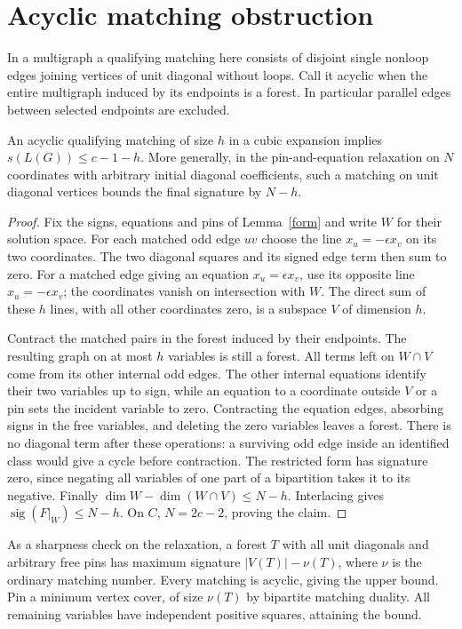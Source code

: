 \documentclass[11pt]{article}
\newcommand{\sig}{\operatorname{sig}}
\begin{document}
\section{Acyclic matching obstruction}
In a multigraph a qualifying matching here consists of disjoint single nonloop edges joining vertices of unit diagonal without loops. Call it acyclic when the entire multigraph induced by its endpoints is a forest. In particular parallel edges between selected endpoints are excluded.
\begin{lemma}\label{forest}
An acyclic qualifying matching of size $h$ in a cubic expansion implies $s(L(G))\le c-1-h$. More generally, in the pin-and-equation relaxation on $N$ coordinates with arbitrary initial diagonal coefficients, such a matching on unit diagonal vertices bounds the final signature by $N-h$.
\end{lemma}
\begin{proof}
Fix the signs, equations and pins of Lemma~\ref{form} and write $W$ for their solution space. For each matched odd edge $uv$ choose the line $x_u=-\epsilon x_v$ on its two coordinates. The two diagonal squares and its signed edge term then sum to zero. For a matched edge giving an equation $x_u=\epsilon x_v$, use its opposite line $x_u=-\epsilon x_v$; the coordinates vanish on intersection with $W$. The direct sum of these $h$ lines, with all other coordinates zero, is a subspace $V$ of dimension $h$.

Contract the matched pairs in the forest induced by their endpoints. The resulting graph on at most $h$ variables is still a forest. All terms left on $W\cap V$ come from its other internal odd edges. The other internal equations identify their two variables up to sign, while an equation to a coordinate outside $V$ or a pin sets the incident variable to zero. Contracting the equation edges, absorbing signs in the free variables, and deleting the zero variables leaves a forest. There is no diagonal term after these operations: a surviving odd edge inside an identified class would give a cycle before contraction. The restricted form has signature zero, since negating all variables of one part of a bipartition takes it to its negative. Finally $\dim W-\dim(W\cap V)\le N-h$. Interlacing gives $\sig(F|_W)\le N-h$. On $C$, $N=2c-2$, proving the claim.
\end{proof}
As a sharpness check on the relaxation, a forest $T$ with all unit diagonals and arbitrary free pins has maximum signature $|V(T)|-\nu(T)$, where $\nu$ is the ordinary matching number. Every matching is acyclic, giving the upper bound. Pin a minimum vertex cover, of size $\nu(T)$ by bipartite matching duality. All remaining variables have independent positive squares, attaining the bound.
\end{document}
